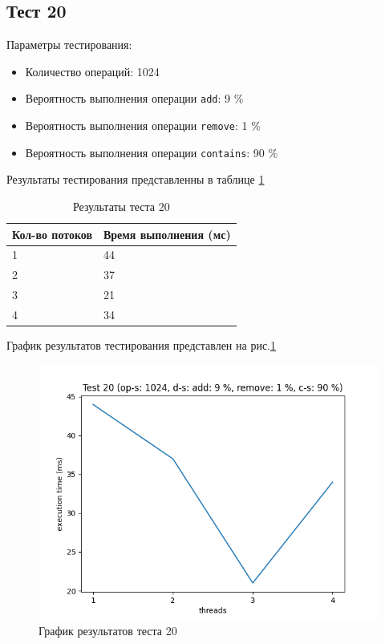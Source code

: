 \subsection*{Тест 20}

Параметры тестирования:

\begin{itemize}
    \item Количество операций: 1024
    \item Вероятность выполнения операции \verb|add|: 9 \%
    \item Вероятность выполнения операции \verb|remove|: 1 \%
    \item Вероятность выполнения операции \verb|contains|: 90 \%
\end{itemize}

Результаты тестирования представленны в таблице \ref{tab:results20}


\begin{table}[H]
    \centering
    \begin{tabular}{|l|l|}
        \hline
        Кол-во потоков & Время выполнения (мс) \\
        \hline
        1 & 44 \\
        \hline
        2 & 37 \\
        \hline
        3 & 21 \\
        \hline
        4 & 34 \\
        \hline
    \end{tabular}
    \caption{Результаты теста 20}
    \label{tab:results20}
\end{table}
        

График результатов тестирования представлен на рис.\ref{fig:plot20}

\begin{figure}[H]
    \centering
    \includegraphics[width=0.7\linewidth]{photo/plot20}
    \caption{График результатов теста 20}
    \label{fig:plot20}
\end{figure}

